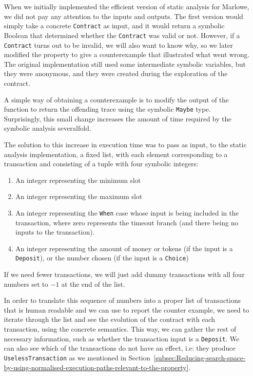 \documentclass[english,runningheads]{llncs}
\begin{document}
When we initially implemented the efficient version of static analysis
for Marlowe, we did not pay any attention to the inputs and outputs.
The first version would simply take a concrete \texttt{Contract}
as input, and it would return a symbolic Boolean that determined whether
the \texttt{Contract} was valid or not. However, if a \texttt{Contract}
turns out to be invalid, we will also want to know why, so we later modified
the property to give a counterexample that illustrated what went wrong.
The original implementation still used some intermediate symbolic
variables, but they were anonymous, and they were created during the
exploration of the contract.

A simple way of obtaining a counterexample is to modify the output
of the function to return the offending trace using the symbolic \texttt{Maybe}
type. Surprisingly, this small change increases the amount of time
required by the symbolic analysis severalfold.

The solution to this increase in execution time was to pass as input, to
the static analysis implementation, a fixed list, with each element corresponding
to a transaction and consisting of a tuple with four symbolic integers:
\begin{enumerate}
\item An integer representing the minimum slot
\item An integer representing the maximum slot
\item An integer representing the \texttt{When} case whose input is being
included in the transaction, where zero represents the timeout branch
(and there being no inputs to the transaction).
\item An integer representing the amount of money or tokens (if the input
is a \texttt{Deposit}), or the number chosen (if the input is a \texttt{Choice})
\end{enumerate}
If we need fewer transactions, we will just add dummy transactions with all four numbers
set to $-1$ at the end of the list.

In order to translate this sequence of numbers into a proper list
of transactions that is human readable and we can use to report the
counter example, we need to iterate through the list and see the evolution
of the contract with each transaction, using the concrete semantics.
This way, we can gather the rest of necessary information, such as
whether the transaction input is a \texttt{Deposit}. We can also see
which of the transactions do not have an effect, i.e: they produce
\texttt{UselessTransaction} as we mentioned in Section~\ref{subsec:Reducing-search-space-by-using-normalised-execution-paths-relevant-to-the-property}.
\end{document}
